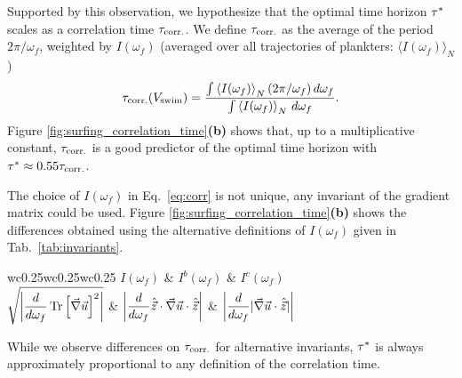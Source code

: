 Supported by this observation, we hypothesize that the optimal time horizon $\TimeHorizonOpt$ scales as a correlation time $\CorrelationTime$.
We define $\CorrelationTime$ as the average of the period $2\pi/\omega_f$, weighted by $I(\omega_f)$ (averaged over all trajectories of plankters: $\langle I(\omega_f) \rangle_N$)
\begin{equation}
	\label{eq:corr}
	\CorrelationTime (\SwimmingVelocity) = \frac{\int \left\langle I(\omega_f) \right\rangle_N (2\pi/\omega_f) \, d\omega_f}{\int \left\langle I(\omega_f) \right\rangle_N \, d\omega_f}.
\end{equation}
Figure \ref{fig:surfing_correlation_time}\textbf{(b)} shows that, up to a multiplicative constant, $\CorrelationTime$ is a good predictor of the optimal time horizon with $\TimeHorizonOpt \approx 0.55 \CorrelationTime$.

The choice of $I(\omega_f)$ in Eq.~\eqref{eq:corr} is not unique, any invariant of the gradient matrix could be used.
Figure \ref{fig:surfing_correlation_time}\textbf{(b)} shows the differences obtained using the alternative definitions of $I(\omega_f)$ given in Tab.~\ref{tab:invariants}.
\begin{table}
	\center
	\begin{tabular}{w{c}{0.25\linewidth}w{c}{0.25\linewidth}w{c}{0.25\linewidth}}
		$I(\omega_f)$ & $I^b(\omega_f)$ & $I^c(\omega_f)$ \\
		$\displaystyle \sqrt{ \abs*{ \frac{d}{d\omega_f} \tr \left[ \Gradients \right]^2 } }$ & $\displaystyle \abs*{ \frac{d}{d\omega_f} \Direction \cdot \Gradients \cdot \Direction}$ & $\displaystyle \abs*{ \frac{d}{d\omega_f} \norm {\Gradients \cdot \Direction} }$ \\
	\end{tabular}
	\caption{Various possible definitions of $I(\omega_f)$ based on different invariants of the flow velocity gradients.}
	\label{tab:invariants}
\end{table}
While we observe differences on $\CorrelationTime$ for alternative invariants, $\TimeHorizonOpt$ is always approximately proportional to any definition of the correlation time.

